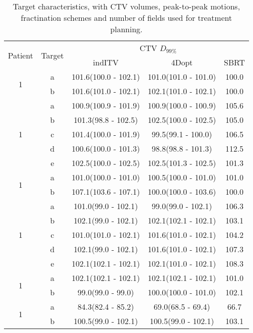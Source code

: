 \begin{table}[H]
	\centering
	\caption{Target characteristics, with CTV volumes, peak-to-peak motions, fractination schemes and number of fields used for treatment planning.}
	\begin{tabular}{c|c|c|c|c}
		\hline\hline
		\multirow{2}{*}{Patient} & \multirow{2}{*}{Target} & \multicolumn{3}{|c}{CTV $D_{99\%}$} \\
		 &  & indITV & 4Dopt & SBRT \\
		 \hline
		 
\multirow{2}{*}{1} & a & 101.6(100.0 - 102.1) & 101.0(101.0 - 101.0) & 100.0\\ 
 & b & 101.6(101.0 - 102.1) & 102.1(101.0 - 102.1) & 100.0\\ 
\hline

\multirow{5}{*}{1} & a & 100.9(100.9 - 101.9) & 100.9(100.0 - 100.9) & 105.6\\ 
 & b & 101.3(98.8 - 102.5) & 102.5(100.0 - 102.5) & 105.0\\ 
 & c & 101.4(100.0 - 101.9) & 99.5(99.1 - 100.0) & 106.5\\ 
 & d & 100.6(100.0 - 101.3) & 98.8(98.8 - 101.3) & 112.5\\ 
 & e & 102.5(100.0 - 102.5) & 102.5(101.3 - 102.5) & 101.3\\ 
\hline

\multirow{2}{*}{1} & a & 101.0(100.0 - 101.0) & 100.5(100.0 - 101.0) & 101.0\\ 
 & b & 107.1(103.6 - 107.1) & 100.0(100.0 - 103.6) & 100.0\\ 
\hline

\multirow{5}{*}{1} & a & 101.0(99.0 - 102.1) & 99.0(99.0 - 102.1) & 106.3\\ 
 & b & 102.1(99.0 - 102.1) & 102.1(102.1 - 102.1) & 103.1\\ 
 & c & 101.0(101.0 - 102.1) & 101.6(101.0 - 102.1) & 104.2\\ 
 & d & 102.1(99.0 - 102.1) & 101.6(101.0 - 102.1) & 107.3\\ 
 & e & 102.1(102.1 - 102.1) & 102.1(101.0 - 102.1) & 108.3\\ 
\hline

\multirow{2}{*}{1} & a & 102.1(102.1 - 102.1) & 102.1(102.1 - 102.1) & 101.0\\ 
 & b & 99.0(99.0 - 99.0) & 100.0(100.0 - 101.0) & 102.1\\ 
\hline

\multirow{2}{*}{1} & a & 84.3(82.4 - 85.2) & 69.0(68.5 - 69.4) & 66.7\\ 
 & b & 100.5(99.0 - 102.1) & 100.5(99.0 - 102.1) & 103.1\\ 
\hline


\end{tabular}
\end{table}

